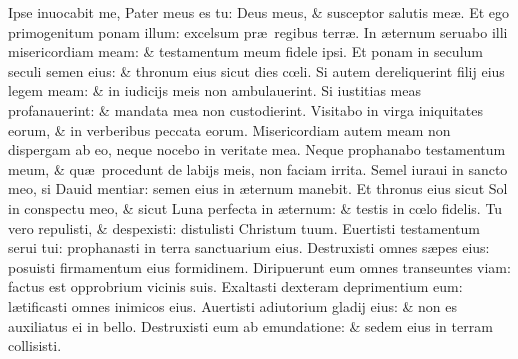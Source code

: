 \documentclass[a5paper,10pt]{book}
\def\ae{æ}
\def\oe{œ}
\begin{document}
\begin{multicols*}{2}
\newline \color{red} I\color{black}pse inuocabit me, Pater meus es tu: Deus meus, \& susceptor salutis me\ae .
\newline \color{red} E\color{black}t ego primogenitum ponam illum: excelsum pr\ae \ regibus terr\ae .
\newline \color{red} I\color{black}n \ae ternum seruabo illi misericordiam meam: \& testamentum meum fidele ipsi.
\newline \color{red} E\color{black}t ponam in seculum seculi semen eius: \& thronum eius sicut dies c\oe li.
\newline \color{red} S\color{black}i autem dereliquerint filij eius legem meam: \& in iudicijs meis non ambulauerint.
\newline \color{red} S\color{black}i iustitias meas profanauerint: \& mandata mea non custodierint.
\newline \color{red} V\color{black}isitabo in virga iniquitates eorum, \& in verberibus peccata eorum.
\newline \color{red} M\color{black}isericordiam autem meam non dispergam ab eo, neque nocebo in veritate mea.
\newline \color{red} N\color{black}eque prophanabo testamentum meum, \& qu\ae \ procedunt de labijs meis, non faciam irrita.
\newline \color{red} S\color{black}emel iuraui in sancto meo, si Dauid mentiar: semen eius in \ae ternum manebit.
\newline \color{red} E\color{black}t thronus eius sicut Sol in conspectu meo, \& sicut Luna perfecta in \ae ternum: \& testis in c\oe lo fidelis.
\newline \color{red} T\color{black}u vero repulisti, \& despexisti: distulisti Christum tuum.
\newline \color{red} E\color{black}uertisti testamentum serui tui: prophanasti in terra sanctuarium eius.
\newline \color{red} D\color{black}estruxisti omnes s\ae pes eius: posuisti firmamentum eius formidinem.
\newline \color{red} D\color{black}iripuerunt eum omnes transeuntes viam: factus est opprobrium vicinis suis.
\newline \color{red} E\color{black}xaltasti dexteram deprimentium eum: l\ae tificasti omnes inimicos eius.
\newline \color{red} A\color{black}uertisti adiutorium gladij eius: \& non es auxiliatus ei in bello.
\newline \color{red} D\color{black}estruxisti eum ab emundatione: \& sedem eius in terram collisisti.

\end{multicols*}
\end{document}
